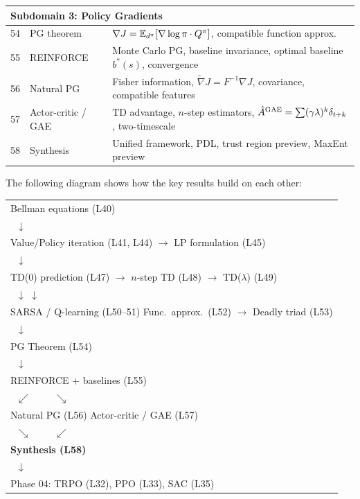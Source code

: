 \documentclass[11pt,a4paper]{article}
\begin{document}
\begin{center}
\begin{tabular}{p{0.7cm}p{4.5cm}p{8cm}}
\midrule
\multicolumn{3}{l}{\textbf{Subdomain 3: Policy Gradients}} \\
\midrule
54 & PG theorem & $\nabla J = \mathbb{E}_{d^\pi}[\nabla \log \pi \cdot
Q^{\pi}]$, compatible function approx. \\
55 & REINFORCE & Monte Carlo PG, baseline invariance, optimal baseline
$b^*(s)$, convergence \\
56 & Natural PG & Fisher information, $\tilde{\nabla}J = F^{-1}
\nabla J$, covariance, compatible features \\
57 & Actor-critic / GAE & TD advantage, $n$-step estimators,
$\hat{A}^{\mathrm{GAE}} = \sum (\gamma\lambda)^k \delta_{t+k}$,
two-timescale \\
58 & Synthesis & Unified framework, PDL, trust region preview, MaxEnt
preview \\
\bottomrule
\end{tabular}
\end{center}

\begin{rlconnection}[title={Dependency Graph of Phase 02}]
The following diagram shows how the key results build on each other:
\begin{center}
\begin{tabular}{l}
Bellman equations (L40) \\
$\;\;\downarrow$ \\
Value/Policy iteration (L41, L44) $\longrightarrow$
LP formulation (L45) \\
$\;\;\downarrow$ \\
TD(0) prediction (L47) $\longrightarrow$
$n$-step TD (L48) $\longrightarrow$
TD($\lambda$) (L49) \\
$\;\;\downarrow$ \hspace{3.5cm} $\downarrow$ \\
SARSA / Q-learning (L50--51) \hspace{0.3cm}
Func.\ approx.\ (L52) $\to$ Deadly triad (L53) \\
$\;\;\downarrow$ \\
PG Theorem (L54) \\
$\;\;\downarrow$ \\
REINFORCE + baselines (L55) \\
$\;\;\swarrow \hspace{1cm} \searrow$ \\
Natural PG (L56) \hspace{0.5cm} Actor-critic / GAE (L57) \\
$\;\;\searrow \hspace{1cm} \swarrow$ \\
\textbf{Synthesis (L58)} \\
$\;\;\downarrow$ \\
Phase 04: TRPO (L32), PPO (L33), SAC (L35) \\
\end{tabular}
\end{center}
\end{rlconnection}
\end{document}
